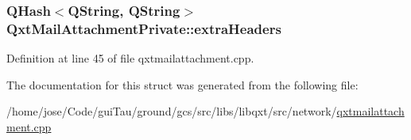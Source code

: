 \hypertarget{struct_qxt_mail_attachment_private_a6f02f1af9bb2febc6835a5ab554e9f4f}{
\subsubsection[{extra\-Headers}]{\setlength{\rightskip}{0pt plus 5cm}Q\-Hash$<${\bf Q\-String}, {\bf Q\-String}$>$ Qxt\-Mail\-Attachment\-Private\-::extra\-Headers}}\label{struct_qxt_mail_attachment_private_a6f02f1af9bb2febc6835a5ab554e9f4f}


Definition at line 45 of file qxtmailattachment.\-cpp.



The documentation for this struct was generated from the following file\-:\begin{DoxyCompactItemize}
\item 
/home/jose/\-Code/gui\-Tau/ground/gcs/src/libs/libqxt/src/network/\hyperlink{qxtmailattachment_8cpp}{qxtmailattachment.\-cpp}\end{DoxyCompactItemize}
